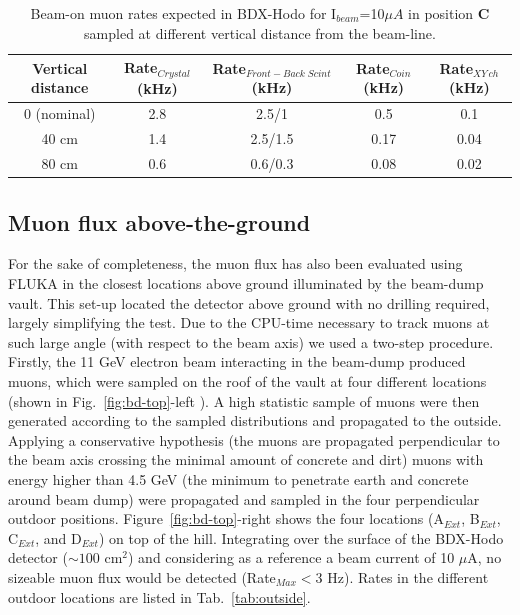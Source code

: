 \begin{table}[htp]
\caption{Beam-on muon rates expected in BDX-Hodo for I$_{beam}$=10$\mu A$ in position {\bf C} sampled at different vertical distance from the beam-line.}
\begin{center}
\begin{tabular}{|c|c|c|c|c|}
\hline
Vertical distance  & Rate$_{Crystal}$  (kHz)&  Rate$_{Front-Back \;Scint} $(kHz) & Rate$_{Coin}$ (kHz) & Rate$_{XY\, ch} $(kHz)\\
\hline\hline
0 (nominal)  & 2.8  &2.5/1    & 0.5 &0.1 \\
 \hline
40 cm & 1.4 &  2.5/1.5 & 0.17 & 0.04 \\
 \hline
80 cm&  0.6  & 0.6/0.3    &  0.08 & 0.02 \\
\hline\hline
\end{tabular}
\end{center}
\label{tab:rate-height}
\end{table}


\subsection{Muon flux above-the-ground}
For the sake of completeness, the muon flux has also been evaluated using FLUKA in the closest locations above ground illuminated by the  beam-dump vault.  This set-up located the detector above ground with no drilling required,  largely  simplifying the test.
Due to the CPU-time necessary to track muons at such large angle (with respect to the beam axis) we used a two-step procedure. Firstly, the 11 GeV electron beam interacting in the beam-dump produced
muons, which were sampled on the roof of the vault  at four  different locations (shown in  Fig.~\ref{fig:bd-top}-left ).
A high statistic sample of muons were then generated according to the sampled distributions and propagated to the outside.  Applying  a conservative hypothesis (the muons are propagated perpendicular to the beam axis  crossing the minimal amount of concrete and dirt) muons with energy higher than 4.5 GeV (the minimum to penetrate earth and concrete around beam dump)  were propagated and sampled in the four  perpendicular outdoor positions. Figure~\ref{fig:bd-top}-right shows the four locations (A$_{Ext}$, B$_{Ext}$, C$_{Ext}$,  and D$_{Ext}$) on top of the hill. Integrating  over the surface of the BDX-Hodo detector ($\sim 100$ cm$^2$) and considering as a reference a beam current of 10 $\mu$A, no sizeable muon flux would be detected (Rate$_{Max}<$3 Hz). Rates in the different outdoor locations are listed in Tab.~\ref{tab:outside}.


